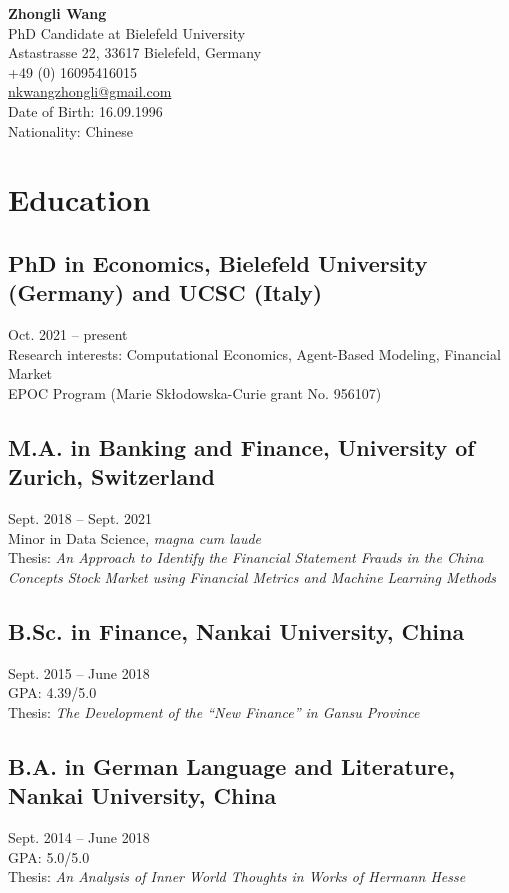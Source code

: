 \documentclass[11pt,a4paper]{article}
\begin{document}
\begin{flushright}
\textbf{Zhongli Wang} \\
PhD Candidate at Bielefeld University \\
Astastrasse 22, 33617 Bielefeld, Germany \\
+49 (0) 16095416015 \\
\href{mailto:nkwangzhongli@gmail.com}{nkwangzhongli@gmail.com} \\
Date of Birth: 16.09.1996 \\
Nationality: Chinese \\
\end{flushright}

\section*{Education}
\subsection*{PhD in Economics, Bielefeld University (Germany) and UCSC (Italy)}
Oct. 2021 -- present \\
Research interests: Computational Economics, Agent-Based Modeling, Financial Market \\
EPOC Program (Marie Sk\l{}odowska-Curie grant No. 956107)

\subsection*{M.A. in Banking and Finance, University of Zurich, Switzerland}
Sept. 2018 -- Sept. 2021 \\
Minor in Data Science, \textit{magna cum laude}  \\
Thesis: \textit{An Approach to Identify the Financial Statement Frauds in the China Concepts Stock Market using Financial Metrics and Machine Learning Methods}

\subsection*{B.Sc. in Finance, Nankai University, China}
Sept. 2015 -- June 2018 \\
GPA: 4.39/5.0 \\
Thesis: \textit{The Development of the ``New Finance'' in Gansu Province}

\subsection*{B.A. in German Language and Literature, Nankai University, China}
Sept. 2014 -- June 2018 \\
GPA: 5.0/5.0 \\
Thesis: \textit{An Analysis of Inner World Thoughts in Works of Hermann Hesse}
\end{document}
